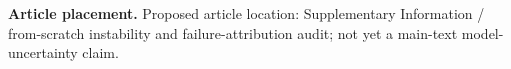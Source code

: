 \textbf{Article placement.} Proposed article location: Supplementary Information / from-scratch instability and failure-attribution audit; not yet a main-text model-uncertainty claim.
